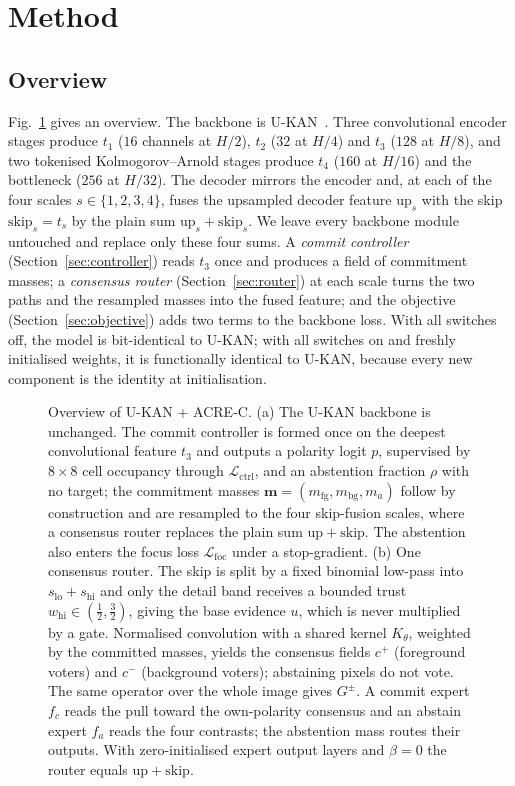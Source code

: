 \section{Method}
\label{sec:method}

\subsection{Overview}
\label{sec:overview}

Fig.~\ref{fig:architecture} gives an overview. The backbone is U-KAN~\cite{li2025ukan}. Three convolutional encoder stages produce $t_1$ ($16$ channels at $H/2$), $t_2$ ($32$ at $H/4$) and $t_3$ ($128$ at $H/8$), and two tokenised Kolmogorov--Arnold stages produce $t_4$ ($160$ at $H/16$) and the bottleneck ($256$ at $H/32$). The decoder mirrors the encoder and, at each of the four scales $s\in\{1,2,3,4\}$, fuses the upsampled decoder feature $\mathrm{up}_s$ with the skip $\mathrm{skip}_s=t_s$ by the plain sum $\mathrm{up}_s+\mathrm{skip}_s$. We leave every backbone module untouched and replace only these four sums. A \emph{commit controller} (Section~\ref{sec:controller}) reads $t_3$ once and produces a field of commitment masses; a \emph{consensus router} (Section~\ref{sec:router}) at each scale turns the two paths and the resampled masses into the fused feature; and the objective (Section~\ref{sec:objective}) adds two terms to the backbone loss. With all switches off, the model is bit-identical to U-KAN; with all switches on and freshly initialised weights, it is functionally identical to U-KAN, because every new component is the identity at initialisation.

\begin{figure}[!t]
\centering

\caption{Overview of U-KAN + ACRE-C. (a) The U-KAN backbone is unchanged. The commit controller is formed once on the deepest convolutional feature $t_3$ and outputs a polarity logit $p$, supervised by $8\times8$ cell occupancy through $\mathcal{L}_{\mathrm{ctrl}}$, and an abstention fraction $\rho$ with no target; the commitment masses $\mathbf{m}=(m_{\mathrm{fg}},m_{\mathrm{bg}},m_a)$ follow by construction and are resampled to the four skip-fusion scales, where a consensus router replaces the plain sum $\mathrm{up}+\mathrm{skip}$. The abstention also enters the focus loss $\mathcal{L}_{\mathrm{foc}}$ under a stop-gradient. (b) One consensus router. The skip is split by a fixed binomial low-pass into $s_{\mathrm{lo}}+s_{\mathrm{hi}}$ and only the detail band receives a bounded trust $w_{\mathrm{hi}}\in(\tfrac12,\tfrac32)$, giving the base evidence $u$, which is never multiplied by a gate. Normalised convolution with a shared kernel $K_\theta$, weighted by the committed masses, yields the consensus fields $c^{+}$ (foreground voters) and $c^{-}$ (background voters); abstaining pixels do not vote. The same operator over the whole image gives $G^{\pm}$. A commit expert $f_c$ reads the pull toward the own-polarity consensus and an abstain expert $f_a$ reads the four contrasts; the abstention mass routes their outputs. With zero-initialised expert output layers and $\beta=0$ the router equals $\mathrm{up}+\mathrm{skip}$.}
\label{fig:architecture}
\end{figure}

